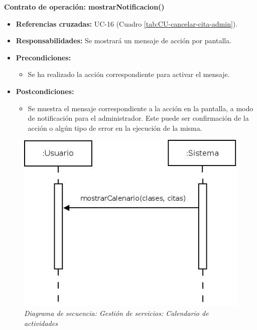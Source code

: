 \textbf{Contrato de operación: mostrarNotificacion()}
\begin{itemize}
\item \textbf{Referencias cruzadas:} UC-16 (Cuadro \ref{tab:CU-cancelar-cita-admin}).
\item \textbf{Responsabilidades:} Se mostrará un mensaje de acción por pantalla.
\item \textbf{Precondiciones:} 
 \begin{itemize}
\item Se ha realizado la acción correspondiente para activar el mensaje.
\end {itemize}
\item \textbf{Postcondiciones:} 
 \begin{itemize}
\item Se muestra el mensaje correspondiente a la acción en la pantalla, a modo de notificación para el administrador. Este puede ser confirmación de la acción o algún tipo de error en la ejecución de la misma.
\end {itemize}
\end {itemize}


\vspace{10mm}

\begin{figure}[H]
\centering
  \includegraphics[scale=.55]{img/secuencias/gestion-servicios-calendario.jpeg}
  \caption{\textit{Diagrama de secuencia: Gestión de servicios: Calendario de actividades}}
  \label{fig:secuencia-gestion-servicios-calendario}
\end{figure}

